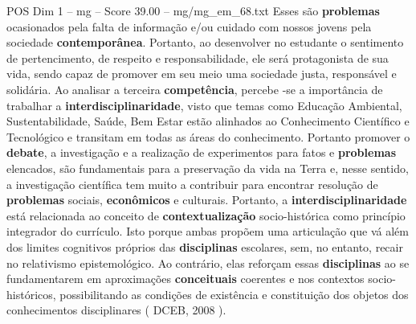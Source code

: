 \begin{textsample}{POS Dim 1 – mg – Score 39.00 – mg/mg\_em\_68.txt}
Esses são \textbf{problemas} ocasionados pela falta de informação e/ou cuidado com nossos jovens pela sociedade \textbf{contemporânea}.
Portanto, ao desenvolver no estudante o sentimento de pertencimento, de respeito e responsabilidade, ele será protagonista de sua vida, sendo capaz de promover em seu meio uma sociedade justa, responsável e solidária.
Ao analisar a terceira \textbf{competência}, percebe -se a importância de trabalhar a \textbf{interdisciplinaridade}, visto que temas como Educação Ambiental, Sustentabilidade, Saúde, Bem Estar estão alinhados ao Conhecimento Científico e Tecnológico e transitam em todas as áreas do conhecimento.
Portanto promover o \textbf{debate}, a investigação e a realização de experimentos para fatos e \textbf{problemas} elencados, são fundamentais para a preservação da vida na Terra e, nesse sentido, a investigação científica tem muito a contribuir para encontrar resolução de \textbf{problemas} sociais, \textbf{econômicos} e culturais.
Portanto, a \textbf{interdisciplinaridade} está relacionada ao conceito de \textbf{contextualização} socio-histórica como princípio integrador do currículo.
Isto porque ambas propõem uma articulação que vá além dos limites cognitivos próprios das \textbf{disciplinas} escolares, sem, no entanto, recair no relativismo epistemológico.
Ao contrário, elas reforçam essas \textbf{disciplinas} ao se fundamentarem em aproximações \textbf{conceituais} coerentes e nos contextos socio-históricos, possibilitando as condições de existência e constituição dos objetos dos conhecimentos disciplinares ( DCEB, 2008 ).

\end{textsample}
